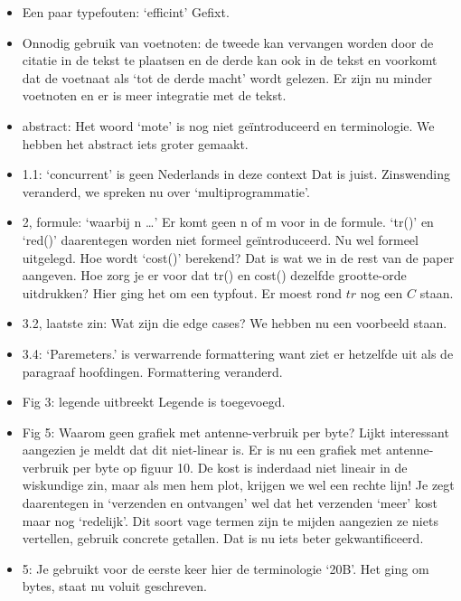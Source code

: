 \documentclass[11pt]{article}
\begin{document}
\begin{itemize}
\item Een paar typefouten: ‘efficint’ {\color{red} Gefixt.}
\item Onnodig gebruik van voetnoten: de tweede kan vervangen worden door de citatie in de tekst te plaatsen en de derde kan ook in de tekst en voorkomt dat de voetnaat als ‘tot de derde macht’ wordt gelezen. {\color{red} Er zijn nu minder voetnoten en er is meer integratie met de tekst.}
\item abstract: Het woord ‘mote’ is nog niet geïntroduceerd en terminologie.{\color{red} We hebben het abstract iets groter gemaakt.}
\item 1.1: ‘concurrent’ is geen Nederlands in deze context {\color{red} Dat is juist. Zinswending veranderd, we spreken nu over `multiprogrammatie'.}
\item 2, formule: ‘waarbij n …’ Er komt geen n of m voor in de formule. ‘tr()’ en ‘red()’ daarentegen worden niet formeel geïntroduceerd. {\color{red} Nu wel formeel uitgelegd.} Hoe wordt ‘cost()’ berekend? {\color{red} Dat is wat we in de rest van de paper aangeven.} Hoe zorg je er voor dat tr() en cost() dezelfde grootte-orde uitdrukken? {\color{red} Hier ging het om een typfout. Er moest rond $tr$ nog een $C$ staan.}
\item 3.2, laatste zin: Wat zijn die edge cases? {\color{red} We hebben nu een voorbeeld staan. }
\item 3.4: ‘Paremeters.’ is verwarrende formattering want ziet er hetzelfde uit als de paragraaf hoofdingen. {\color{red} Formattering veranderd. }
\item Fig 3: legende uitbreekt {\color{red} Legende is toegevoegd.}
\item Fig 5: Waarom geen grafiek met antenne-verbruik per
byte? Lijkt interessant aangezien je meldt dat dit niet-linear is. {\color{red}
Er is nu een grafiek met antenne-verbruik per byte op figuur 10. De kost is
inderdaad niet lineair in de wiskundige zin, maar als men hem plot, krijgen we
wel een rechte lijn!} Je zegt daarentegen in ‘verzenden en ontvangen’ wel dat
het verzenden ‘meer’ kost maar nog ‘redelijk’. Dit soort vage termen zijn te
mijden aangezien ze niets vertellen, gebruik concrete getallen.{\color{red} Dat
is nu iets beter gekwantificeerd.}
\item 5: Je gebruikt voor de eerste keer hier de terminologie ‘20B’. {\color{red} Het ging om bytes, staat nu voluit geschreven.}
\end{itemize}
\end{document}
